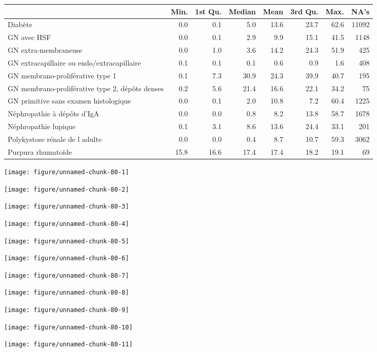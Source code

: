 \documentclass[11pt,a4paper]{article}\usepackage[]{graphicx}\usepackage[]{color}
\makeatletter
\def\maxwidth{ %
  \ifdim\Gin@nat@width>\linewidth
    \linewidth
  \else
    \Gin@nat@width
  \fi
}
\newenvironment{knitrout}{}{} %
\makeatother
\begin{document}
\begin{table}[H]
\centering
\begin{tabular}{lrrrrrrr}
  \hline
 & Min. & 1st Qu. & Median & Mean & 3rd Qu. & Max. & NA's \\ 
  \hline
Diabète & 0.0 & 0.1 & 5.0 & 13.6 & 23.7 & 62.6 & 11092 \\ 
  GN avec HSF & 0.0 & 0.1 & 2.9 & 9.9 & 15.1 & 41.5 & 1148 \\ 
  GN extra-membraneuse & 0.0 & 1.0 & 3.6 & 14.2 & 24.3 & 51.9 & 425 \\ 
  GN extracapillaire ou endo/extracapillaire & 0.1 & 0.1 & 0.1 & 0.6 & 0.9 & 1.6 & 408 \\ 
  GN membrano-proliférative type 1 & 0.1 & 7.3 & 30.9 & 24.3 & 39.9 & 40.7 & 195 \\ 
  GN membrano-proliférative type 2, dépôts denses & 0.2 & 5.6 & 21.4 & 16.6 & 22.1 & 34.2 & 75 \\ 
  GN primitive sans examen histologique & 0.0 & 0.1 & 2.0 & 10.8 & 7.2 & 60.4 & 1225 \\ 
  Néphropathie à dépôts d'IgA & 0.0 & 0.0 & 0.8 & 8.2 & 13.8 & 58.7 & 1678 \\ 
  Néphropathie lupique & 0.1 & 3.1 & 8.6 & 13.6 & 24.4 & 33.1 & 201 \\ 
  Polykystose rénale de l adulte & 0.0 & 0.0 & 0.4 & 8.7 & 10.7 & 59.3 & 3062 \\ 
  Purpura rhumatoïde & 15.8 & 16.6 & 17.4 & 17.4 & 18.2 & 19.1 & 69 \\ 
   \hline
\end{tabular}
\end{table}



\begin{knitrout}
\color{fgcolor}
\texttt{[image: figure/unnamed-chunk-80-1]} 

\texttt{[image: figure/unnamed-chunk-80-2]} 

\texttt{[image: figure/unnamed-chunk-80-3]} 

\texttt{[image: figure/unnamed-chunk-80-4]} 

\texttt{[image: figure/unnamed-chunk-80-5]} 

\texttt{[image: figure/unnamed-chunk-80-6]} 

\texttt{[image: figure/unnamed-chunk-80-7]} 

\texttt{[image: figure/unnamed-chunk-80-8]} 

\texttt{[image: figure/unnamed-chunk-80-9]} 

\texttt{[image: figure/unnamed-chunk-80-10]} 

\texttt{[image: figure/unnamed-chunk-80-11]} 

\end{knitrout}
\end{document}
